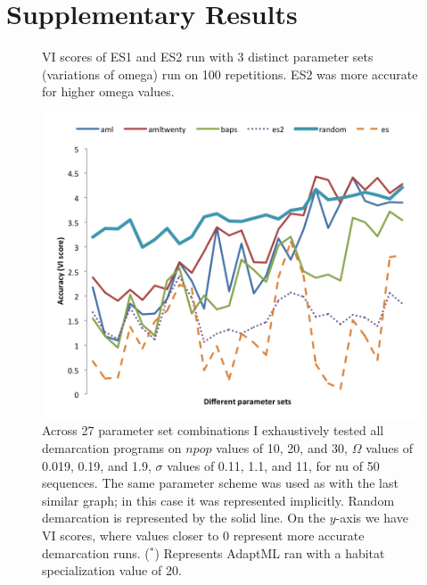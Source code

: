 \chapter{Supplementary Results}
\begin{figure}[h!]
\centering
\noindent{}
\caption[Output file of ES1, ES2 comparison query.]{VI scores of ES1 and ES2 run with 3 distinct parameter sets (variations of omega) run on 100 repetitions. ES2 was more accurate for higher omega values.}
\label{fig:HundredResultsFile}
\end{figure}


\begin{figure}[h!]
  \centering
    \includegraphics[scale=0.75]{images/ResultGraphs/ResultGraphs-3}
      \caption[All demarcation graphical accuracy visualization on $nu = 50$.]{Across 27 parameter set combinations I exhaustively tested all demarcation programs on $npop$ values of 10, 20, and 30, $\Omega$ values of 0.019, 0.19, and 1.9, $\sigma$ values of 0.11, 1.1, and 11, for nu of 50 sequences. The same parameter scheme was used as with the last similar graph; in this case it was represented implicitly. Random demarcation is represented by the solid line. On the $y$-axis we have VI scores, where values closer to 0 represent more accurate demarcation runs.  ($^\ast$) Represents AdaptML ran with a habitat specialization value of 20.}
    \label{fig:All50}
\end{figure}

